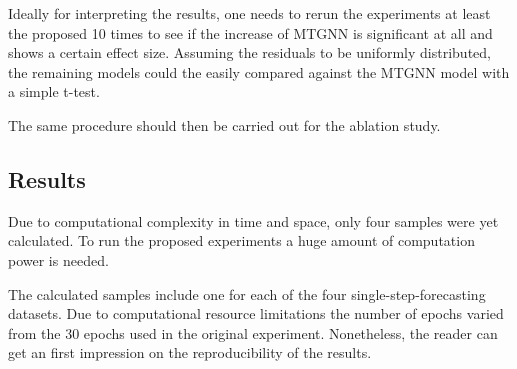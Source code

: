 \documentclass[letterpaper,twocolumn,11pt]{article}
\begin{document}
    Ideally for interpreting the results, one needs to rerun the experiments at least the proposed 10 times to see if the increase of MTGNN is significant at all and shows a certain effect size.
    Assuming the residuals to be uniformly distributed, the remaining models could the easily compared against the MTGNN model with a simple t-test.

    The same procedure should then be carried out for the ablation study.

    \subsection{Results}
    Due to computational complexity in time and space, only four samples were yet calculated.
    To run the proposed experiments a huge amount of computation power is needed.

    The calculated samples include one for each of the four single-step-forecasting datasets.
    Due to computational resource limitations the number of epochs varied from the 30 epochs used in the original experiment.
    Nonetheless, the reader can get an first impression on the reproducibility of the results.


\end{document}
